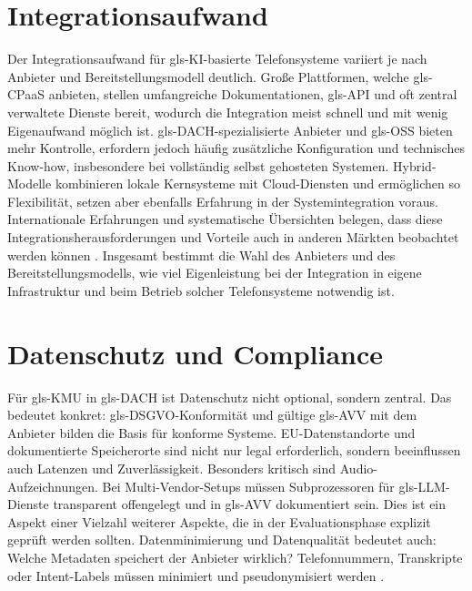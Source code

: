 \section{Integrationsaufwand }

Der Integrationsaufwand für \gls{gls-KI}-basierte Telefonsysteme variiert je nach Anbieter und Bereitstellungsmodell deutlich. Gro\ss e Plattformen, welche \gls{gls-CPaaS} anbieten, stellen umfangreiche Dokumentationen, \gls{gls-API} und oft zentral verwaltete Dienste bereit, wodurch die Integration meist schnell und mit wenig Eigenaufwand möglich ist. \gls{gls-DACH}-spezialisierte Anbieter und \gls{gls-OSS} bieten mehr Kontrolle, erfordern jedoch häufig zusätzliche Konfiguration und technisches Know-how, insbesondere bei vollständig selbst gehosteten Systemen. Hybrid-Modelle kombinieren lokale Kernsysteme mit Cloud-Diensten und ermöglichen so Flexibilität, setzen aber ebenfalls Erfahrung in der Systemintegration voraus. Internationale Erfahrungen und systematische Übersichten belegen, dass diese Integrationsherausforderungen und Vorteile auch in anderen Märkten beobachtet werden können \parencite{Todorov2025LLMDispatcher,Ngobeni2025AIVoIP}. Insgesamt bestimmt die Wahl des Anbieters und des Bereitstellungsmodells, wie viel Eigenleistung bei der Integration in eigene Infrastruktur und beim Betrieb solcher Telefonsysteme notwendig ist.

\section{Datenschutz und Compliance}\label{sec:datenschutz_compliance}

Für \gls{gls-KMU} in \gls{gls-DACH} ist Datenschutz nicht optional, sondern zentral. Das bedeutet konkret: \gls{gls-DSGVO}-Konformität und gültige \gls{gls-AVV} mit dem Anbieter bilden die Basis für konforme Systeme. EU-Datenstandorte und dokumentierte Speicherorte sind nicht nur legal erforderlich, sondern beeinflussen auch Latenzen und Zuverlässigkeit. Besonders kritisch sind Audio-Aufzeichnungen. Bei Multi-Vendor-Setups müssen Subprozessoren für \gls{gls-LLM}-Dienste transparent offengelegt und in \gls{gls-AVV} dokumentiert sein. Dies ist ein Aspekt einer Vielzahl weiterer Aspekte, die in der Evaluationsphase explizit geprüft werden sollten. Datenminimierung und Datenqualität
bedeutet auch: Welche Metadaten speichert der Anbieter wirklich? Telefonnummern, Transkripte oder Intent-Labels müssen minimiert und pseudonymisiert werden \parencite{Data2025_AIDataQuality}.

